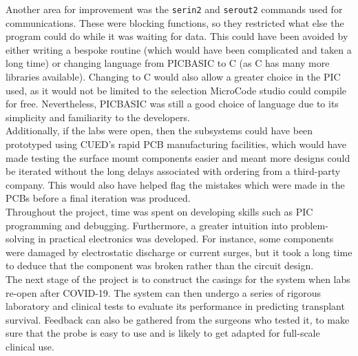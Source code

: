 Another area for improvement was the \verb|serin2| and \verb|serout2| commands used for communications. These were blocking functions, so they restricted what else the program could do while it was waiting for data. This could have been avoided by either writing a bespoke routine (which would have been complicated and taken a long time) or changing language from PICBASIC to C (as C has many more libraries available). Changing to C would also allow a greater choice in the PIC used, as it would not be limited to the selection MicroCode studio could compile for free. Nevertheless, PICBASIC was still a good choice of language due to its simplicity and familiarity to the developers.\\

Additionally, if the labs were open, then the subsystems could have been prototyped using CUED's rapid PCB manufacturing facilities, which would have made testing the surface mount components easier and meant more designs could be iterated without the long delays associated with ordering from a third-party company. This would also have helped flag the mistakes which were made in the PCBs before a final iteration was produced. \\

Throughout the project, time was spent on developing skills such as PIC programming and debugging. Furthermore, a greater intuition into problem-solving in practical electronics was developed. For instance, some components were damaged by electrostatic discharge or current surges, but it took a long time to deduce that the component was broken rather than the circuit design. \\

The next stage of the project is to construct the casings for the system when labs re-open after COVID-19. The system can then undergo a series of rigorous laboratory and clinical tests to evaluate its performance in predicting transplant survival. Feedback can also be gathered from the surgeons who tested it, to make sure that the probe is easy to use and is likely to get adapted for full-scale clinical use.\\